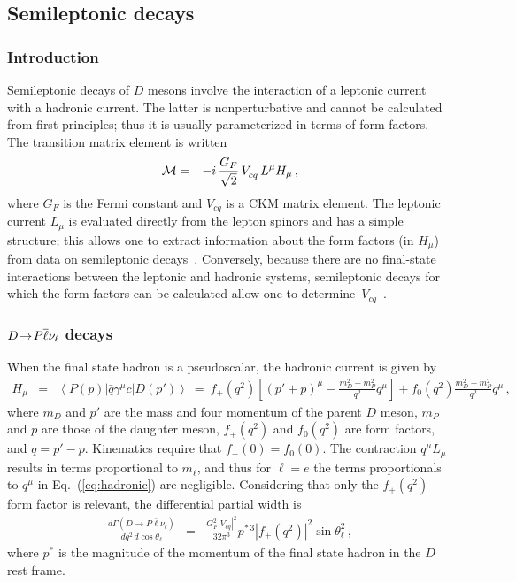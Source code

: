 \subsection{Semileptonic decays}

\subsubsection{Introduction}

Semileptonic decays of $D$ mesons involve the interaction of a leptonic
current with a hadronic current. The latter is nonperturbative
and cannot be calculated from first principles; thus it is usually
parameterized in terms of form factors. The transition matrix element 
is written
\begin{eqnarray}
  {\cal M} & = & -i\,\frac{G_F}{\sqrt{2}}\,V^{}_{cq}\,L^\mu H_\mu\,,
  \label{Melem}
\end{eqnarray}
where $G_F$ is the Fermi constant and $V^{}_{cq}$ is a CKM matrix element.
The leptonic current $L_\mu$ is evaluated directly from the lepton spinors 
and has a simple structure; this allows one to extract information about 
the form factors (in $H^{}_\mu$) from data on semileptonic decays~\cite{Becher:2005bg}.  
Conversely, because there are no final-state interactions between the
leptonic and hadronic systems, semileptonic decays for which the form 
factors can be calculated allow one to 
determine~$V^{}_{cq}$~\cite{Kobayashi:1973fv}.

\subsubsection{$D\!\rightarrow\! P \overline \ell \nu_{\ell}$ decays}

When the final state hadron is a pseudoscalar, the hadronic 
current is given by
\begin{eqnarray}
H_\mu & = & \left< P(p) | \bar{q}\gamma^\mu c | D(p') \right> \ =\  
f_+(q^2)\left[ (p' + p)^\mu -\frac{m_D^2-m_P^2}{q^2}q^\mu\right] + 
 f_0(q^2)\frac{m_D^2-m_P^2}{q^2}q^\mu\,,
\label{eq:hadronic}
\end{eqnarray}
where $m_D$ and $p'$ are the mass and four momentum of the 
parent $D$ meson, $m_P$ and $p$ are those of the daughter meson, 
$f_+(q^2)$ and $f_0(q^2)$ are form factors, and $q = p' - p$.  
Kinematics require that $f_+(0) = f_0(0)$.
The contraction $q^\mu L_\mu$ results in terms proportional 
to $m^{}_\ell$\cite{Gilman:1989uy}, and thus for $\ell=e $
the terms proportionals to $q^\mu$ in Eq.~(\ref{eq:hadronic}) are negligible. 
Considering that only the $f_+(q^2)$ form factor 
is relevant, the differential partial width is
\begin{eqnarray}
\frac{d\Gamma(D \to P \bar \ell \nu_\ell)}{dq^2\, d\cos\theta_\ell} & = & 
   \frac{G_F^2|V_{cq}|^2}{32\pi^3} p^{*\,3}|f_{+}(q^2)|^2\sin\theta^2_\ell\,,
\label{eq:dGamma}
\end{eqnarray}
where ${p^*}$ is the magnitude of the momentum of the final state hadron
in the $D$ rest frame.

